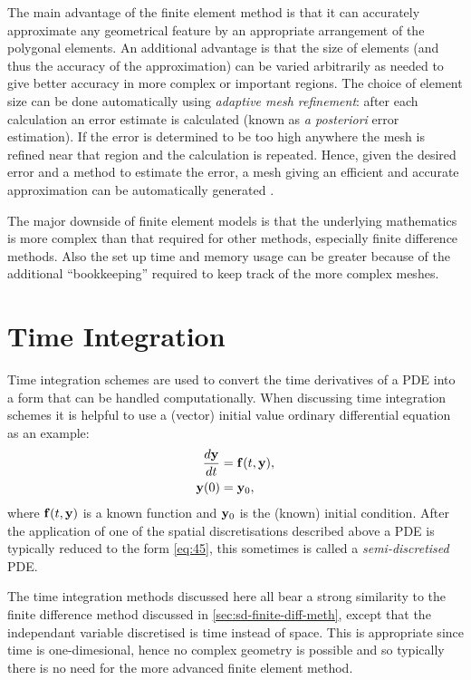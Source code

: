 The main advantage of the finite element method is that it can accurately approximate any geometrical feature by an appropriate arrangement of the polygonal elements.
An additional advantage is that the size of elements (and thus the accuracy of the approximation) can be varied arbitrarily as needed to give better accuracy in more complex or important regions. 
The choice of element size can be done automatically using \emph{adaptive mesh refinement}: after each calculation an error estimate is calculated (known as \emph{a posteriori} error estimation).
If the error is determined to be too high anywhere the mesh is refined near that region and the calculation is repeated.
Hence, given the desired error and a method to estimate the error, a mesh giving an efficient and accurate approximation can be automatically generated \cite{Schrefl1999}.

The major downside of finite element models is that the underlying mathematics is more complex than that required for other methods, especially finite difference methods.
Also the set up time and memory usage can be greater because of the additional ``bookkeeping'' required to keep track of the more complex meshes.


\section{Time Integration}
\label{sec:time-discretisation}

Time integration schemes are used to convert the time derivatives of a PDE into a form that can be handled computationally. 
When discussing time integration schemes it is helpful to use a (vector) initial value ordinary differential equation as an example:
\begin{equation}
  \begin{aligned}
    \frac{d \mathbf{y}}{dt} &= {\mathbf{f}{\left( t, \mathbf{y} \right)}}, \\
    \mathbf{y}(0) &= \mathbf{y}_0,
    \label{eq:45}
  \end{aligned}
\end{equation}
where ${\mathbf{f}}(t,\mathbf{y})$ is a known function and $\mathbf{y}_0$ is the (known) initial condition.
After the application of one of the spatial discretisations described above a PDE is typically reduced to the form \cref{eq:45}, this sometimes is called a \emph{semi-discretised} PDE.

The time integration methods discussed here all bear a strong similarity to the finite difference method discussed in \cref{sec:sd-finite-diff-meth}, except that the independant variable discretised is time instead of space.
This is appropriate since time is one-dimesional, hence no complex geometry is possible and so typically there is no need for the more advanced finite element method.

